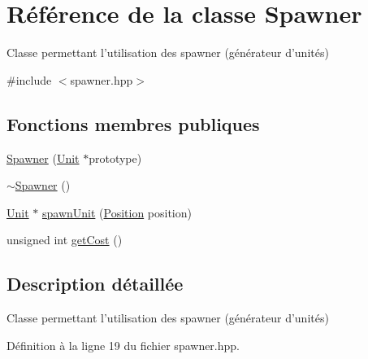 \hypertarget{classSpawner}{\section{Référence de la classe Spawner}
\label{classSpawner}
}


Classe permettant l'utilisation des spawner (générateur d'unités)  




{\ttfamily \#include $<$spawner.\+hpp$>$}

\subsection*{Fonctions membres publiques}
\begin{DoxyCompactItemize}
\item 
\hyperlink{classSpawner_a184706828dba74f9400a0e7ed175998c}{Spawner} (\hyperlink{classUnit}{Unit} $\ast$prototype)
\item 
\hyperlink{classSpawner_a59d8e3d4d6dc6c25f38ce5d4fcc5e8e6}{$\sim$\+Spawner} ()
\item 
\hyperlink{classUnit}{Unit} $\ast$ \hyperlink{classSpawner_ac3b94465446cf0afe31fd6bd5d135c65}{spawn\+Unit} (\hyperlink{classPosition}{Position} position)
\item 
unsigned int \hyperlink{classSpawner_a10e44285b671baeeb4e83eae92bdcf86}{get\+Cost} ()
\end{DoxyCompactItemize}


\subsection{Description détaillée}
Classe permettant l'utilisation des spawner (générateur d'unités) 

Définition à la ligne 19 du fichier spawner.\+hpp.



